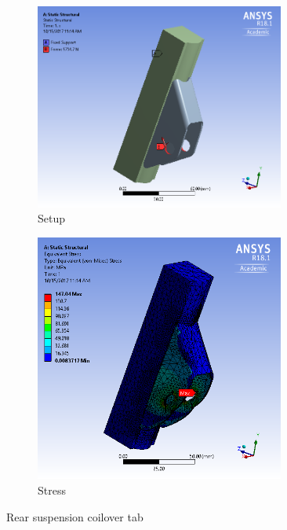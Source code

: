 \documentclass[10pt]{article}
\begin{document}
\begin{figure}[H]
\centering
\begin{subfigure}[b]{.48\textwidth}
\centering
\includegraphics[width=0.9\textwidth]{figures/fea/parts/MS00047-RearSuspensionCoiloverTab-Setup}
\caption{Setup}
\end{subfigure}
\begin{subfigure}[b]{.48\textwidth}
\centering
\includegraphics[width=0.9\textwidth]{figures/fea/parts/MS00047-RearSuspensionCoiloverTab-Stress}
\caption{Stress}
\end{subfigure}
\caption{Rear suspension coilover tab}
\label{fig:MS00047-RearSuspensionCoiloverTab}
\end{figure}
\end{document}
